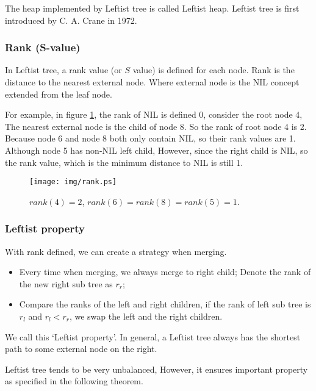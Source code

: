 \documentclass{article}
\begin{document}
The heap implemented by Leftist tree is called Leftist heap. Leftist
tree is first introduced by C. A. Crane in 1972\cite{wiki-leftist-tree}.

\subsubsection{Rank (S-value)}

In Leftist tree, a rank value (or $S$ value) is defined for each node.
Rank is the distance to the nearest external node. Where external node
is the NIL concept extended from the leaf node.

For example, in figure \ref{fig:rank}, the rank of NIL
is defined 0, consider the root node 4, The nearest external node is
the child of node 8. So the rank of root node 4 is 2. Because node
6 and node 8 both only contain NIL, so their rank values are 1.
Although node 5 has non-NIL left child, However, since the right
child is NIL, so the rank value, which is the minimum distance
to NIL is still 1.

\begin{figure}[htbp]
   \begin{center}
     \texttt{[image: img/rank.ps]}
     \caption{$rank(4) = 2$, $rank(6) = rank(8) = rank(5) = 1$.} \label{fig:rank}
   \end{center}
\end{figure}

\subsubsection{Leftist property}

With rank defined, we can create a strategy when merging.

\begin{itemize}
\item Every time when merging, we always merge to right child; Denote the rank
of the new right sub tree as $r_r$;
\item Compare the ranks of the left and right children, if the rank of
left sub tree is $r_l$ and $r_l < r_r$, we swap the left and the right children.
\end{itemize}

We call this `Leftist property'. In general, a Leftist tree always
has the shortest path to some external node on the right.

Leftist tree tends to be very unbalanced, However, it ensures important
property as specified in the following theorem.
\end{document}
